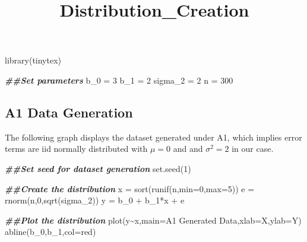 \documentclass[
]{article}
\title{Distribution\_Creation}
\author{}
\date{\vspace{-2.5em}}
\newenvironment{Shaded}{\begin{snugshade}}{\end{snugshade}}
\newcommand{\AttributeTok}[1]{\textcolor[rgb]{0.77,0.63,0.00}{#1}}
\newcommand{\DecValTok}[1]{\textcolor[rgb]{0.00,0.00,0.81}{#1}}
\newcommand{\DocumentationTok}[1]{\textcolor[rgb]{0.56,0.35,0.01}{\textbf{\textit{#1}}}}
\newcommand{\FunctionTok}[1]{\textcolor[rgb]{0.00,0.00,0.00}{#1}}
\newcommand{\NormalTok}[1]{#1}
\newcommand{\OtherTok}[1]{\textcolor[rgb]{0.56,0.35,0.01}{#1}}
\newcommand{\SpecialCharTok}[1]{\textcolor[rgb]{0.00,0.00,0.00}{#1}}
\newcommand{\StringTok}[1]{\textcolor[rgb]{0.31,0.60,0.02}{#1}}
\begin{document}
\maketitle

\begin{Shaded}
\begin{Highlighting}[]
\FunctionTok{library}\NormalTok{(tinytex)}

\DocumentationTok{\#\#Set parameters}
\NormalTok{b\_0 }\OtherTok{=} \DecValTok{3}
\NormalTok{b\_1 }\OtherTok{=} \DecValTok{2}
\NormalTok{sigma\_2 }\OtherTok{=} \DecValTok{2}
\NormalTok{n }\OtherTok{=} \DecValTok{300}
\end{Highlighting}
\end{Shaded}

\hypertarget{a1-data-generation}{%
\subsection{A1 Data Generation}\label{a1-data-generation}}

The following graph displays the dataset generated under A1, which
implies error terms are iid normally distributed with \(\mu = 0\) and
and \(\sigma^2=2\) in our case.

\begin{Shaded}
\begin{Highlighting}[]
\DocumentationTok{\#\#Set seed for dataset generation}
\FunctionTok{set.seed}\NormalTok{(}\DecValTok{1}\NormalTok{)}

\DocumentationTok{\#\#Create the distribution}
\NormalTok{x }\OtherTok{=} \FunctionTok{sort}\NormalTok{(}\FunctionTok{runif}\NormalTok{(n,}\AttributeTok{min=}\DecValTok{0}\NormalTok{,}\AttributeTok{max=}\DecValTok{5}\NormalTok{))}
\NormalTok{e }\OtherTok{=} \FunctionTok{rnorm}\NormalTok{(n,}\DecValTok{0}\NormalTok{,}\FunctionTok{sqrt}\NormalTok{(sigma\_2))}
\NormalTok{y }\OtherTok{=}\NormalTok{ b\_0 }\SpecialCharTok{+}\NormalTok{ b\_1}\SpecialCharTok{*}\NormalTok{x }\SpecialCharTok{+}\NormalTok{ e}

\DocumentationTok{\#\#Plot the distribution }
\FunctionTok{plot}\NormalTok{(y}\SpecialCharTok{\textasciitilde{}}\NormalTok{x,}\AttributeTok{main=}\StringTok{\textquotesingle{}A1 Generated Data\textquotesingle{}}\NormalTok{,}\AttributeTok{xlab=}\StringTok{\textquotesingle{}X\textquotesingle{}}\NormalTok{,}\AttributeTok{ylab=}\StringTok{\textquotesingle{}Y\textquotesingle{}}\NormalTok{)}
\FunctionTok{abline}\NormalTok{(b\_0,b\_1,}\AttributeTok{col=}\StringTok{\textquotesingle{}red\textquotesingle{}}\NormalTok{)}
\end{Highlighting}
\end{Shaded}
\end{document}
